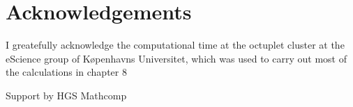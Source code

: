 \chapter*{Acknowledgements}



I greatefully acknowledge the computational time at the octuplet cluster at
the eScience group of Køpenhavns Universitet, which was used to carry out
most of the calculations in chapter 8

Support by HGS Mathcomp
